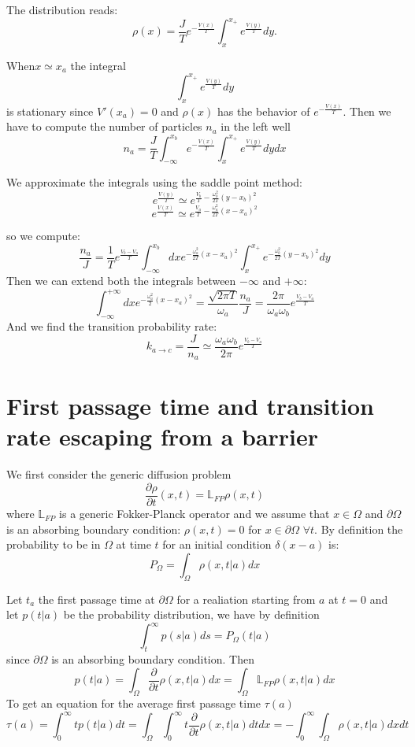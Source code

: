 The distribution reads:
$$
\rho(x) = \frac{J}{T} e^{-\frac{V(x)}{T}}\int_x^{x_{+}}e^{\frac{V(y)}{T}}dy.
$$

When$x \simeq x_a$ the integral
$$
\int_x^{x_{+}}e^{\frac{V(y)}{T}}dy
$$
is stationary since $V'(x_a) = 0$ and $\rho(x)$ has the behavior of $e^{-\frac{V(x)}{T}}$.
Then we have to compute the number of particles $n_a$ in the left well
$$
n_a = \frac{J}{T}\int_{-\infty}^{x_{b}} e^{-\frac{V(x)}{T}} \int_{x}^{x_+} e^{\frac{V(y)}{T}} dy dx
$$

We approximate the integrals using the saddle point method:
$$
e^{\frac{V(y)}{T}} \simeq e^{\frac{V_b}{T} - \frac{\omega^2_b}{2T}(y-x_b)^2}
$$
$$
e^{\frac{V(x)}{T}} \simeq e^{\frac{V_a}{T} - \frac{\omega^2_a}{2T}(x-x_a)^2}
$$

so we compute:
$$
\frac{n_a}{J} = \frac{1}{T} e^{\frac{V_b-V_a}{T}}\int_{-\infty}^{x_b}dxe^{-\frac{\omega_a^2}{2T}(x-x_a)^2}\int_x^{x_+}e^{-\frac{\omega_b^2}{2T}(y-x_b)^2 }dy
$$
Then we can extend both the integrals between $-\infty$ and $+\infty$:
$$
\int_{-\infty}^{+\infty}dxe^{-\frac{\omega_a^2}{2}(x-x_a)^2} = \frac{\sqrt{2 \pi T}}{\omega_a}\frac{n_a}{J}=\frac{2\pi}{\omega_a\omega_b}e^{\frac{V_b-V_a}{T}}
$$
And we find the transition probability rate:
$$
k_{a\to c} = \frac{J}{n_a} \simeq \frac{\omega_a \omega_b}{2 \pi} e^{\frac{V_b-V_a}{T}}
$$

\section{First passage time and transition rate escaping from a barrier}
We first consider the generic diffusion problem 
$$
\frac{\partial \rho}{\partial t} (x,t) = \mathbb{L}_{FP} \rho(x,t)
$$
where $\mathbb{L}_{FP}$ is a generic Fokker-Planck operator and we assume that $x \in \Omega$ and $\partial \Omega$ is an absorbing boundary condition: $\rho(x,t) =0 $ for $x\in \partial \Omega$ $\forall t$. By definition the probability to be in $\Omega$ at time $t$ for an initial condition $\delta(x-a)$ is:
$$
P_{\Omega} = \int_{\Omega} \rho(x,t|a)dx 
$$

Let $t_a$ the first passage time at $\partial \Omega$ for a realiation starting from $a$ at $t=0$ and let $p(t|a)$ be the probability distribution, we have by definition 
$$
\int_t^{\infty} p(s|a)ds = P_\Omega(t|a)
$$
since $\partial \Omega$ is an absorbing boundary condition. Then
$$
p(t|a) = \int_{\Omega} \frac{\partial}{\partial t} \rho (x,t|a)dx = \int_{\Omega} \mathbb{L}_{FP} \rho(x,t|a)dx
$$
To get an equation for the average first passage time $\tau(a)$
$$
\tau(a) = \int_{0}^{\infty} t p(t|a) dt = \int_{\Omega}\int_{0}^{\infty} t \frac{\partial}{\partial t} \rho(x,t|a)dt dx = - \int_{0}^{\infty} \int_\Omega \rho(x,t|a)dx dt
$$

